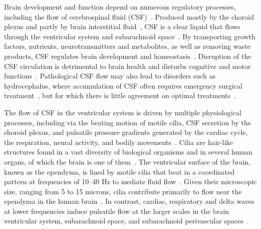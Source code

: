 \documentclass{WileyMSP-template}
\begin{document}
Brain development and function depend on numerous regulatory
processes, including the flow of cerebrospinal fluid
(CSF)~\cite{fame2020emergence}. Produced mostly by the choroid
plexus and partly by brain interstitial fluid~\cite{Brodal2016},
CSF is a clear liquid that flows through the ventricular system and subarachnoid
space~\cite{Damkier2013}. By transporting growth factors, nutrients, neurotransmitters
and metabolites, as well as removing waste products, CSF regulates
brain development and homeostasis~\cite{Ringers2020Role, fame2020emergence, del2010ependymal}.
Disruption of the CSF circulation is detrimental to brain health and disturbs
cognitive and motor functions~\cite{Johanson2008}.
Pathological CSF flow may also lead to
disorders such as hydrocephalus, where accumulation of
CSF often requires emergency surgical
treatment~\cite{duy2022rethinking, kahle2024paediatric, wallmeier2022role},
but for which there is little agreement on optimal treatments~\cite{flannery2014pediatric}. 

The flow of CSF in the ventricular system is driven by multiple
physiological processes, including via the beating motion of motile
cilia, CSF secretion by the choroid plexus, and pulsatile pressure gradients generated by the
cardiac cycle, the respiration, neural activity, and bodily
movements~\cite{Brodal2016, del2010ependymal, Ringers2020Role, Vinje2019RespiratoryMeasurements,
Kurtcuoglu2005ComputationalSystem, Olstad2019CiliaryDevelopment,
macaulay2022cerebrospinal, mestre2018flow}.
Cilia are hair-like structures found in a vast diversity of
biological organisms and in several human organs,
of which the brain is one of them~\cite{Fulford1986Muco-ciliaryLung,
Pacherres2022CiliaryProduction, Jahn1972LocomotionProtozoa,
Brennen1977FluidFlagella, Ringers2020Role, spassky2013motile,
DGama2025MotileBrain, mitchell2007evolution,
Tsukita2012CoordinatedFeet, BLAKE1974MechanicsMotion,
Reiten2017Motile-Cilia-MediatedComputations, Thouvenin2020OriginCanal}. 
The ventricular surface of the brain, known as the ependyma, is lined by
motile cilia that beat in a coordinated pattern at frequencies of
10--40 Hz to mediate fluid flow~\cite{mitchell2007evolution,
Ringers2020Role, spassky2013motile, Ringers2023NovelEpithelia, roth2025structure}. 
Given their microscopic size, ranging from
5 to 15 microns, cilia contribute primarily to flow near the
ependyma in the human brain~\cite{Siyahhan2014FlowVentricles, Olstad2019CiliaryDevelopment,
Ringers2020Role, Faubel2016Cilia-basedVentricles}. In contrast, cardiac,
respiratory and delta waves at lower frequencies induce pulsatile flow
at the larger scales in the brain ventricular system, subarachnoid space, and
subarachnoid perivascular
spaces~\cite{Vinje2019RespiratoryMeasurements, eide2024functional,
Causemann2025, fultz2019coupled, mestre2018flow, daversin2020mechanisms}.
\end{document}
